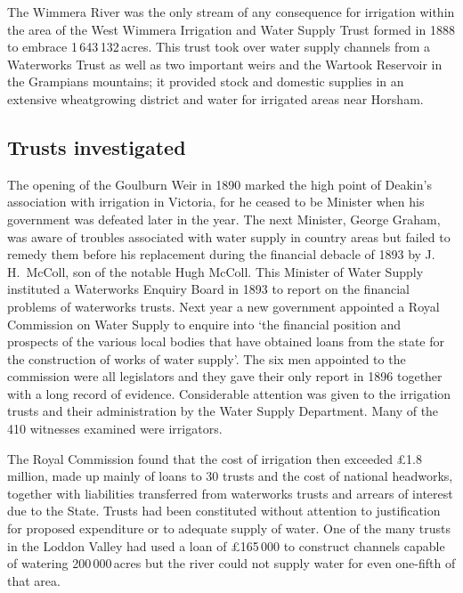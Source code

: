 The Wimmera River  was the only stream of any
consequence for irrigation within the area of the West Wimmera
Irrigation and Water Supply Trust  formed in 1888 to embrace 1\,643\,132\,acres. This trust took
over water supply channels from a Waterworks Trust as well as two
important weirs and the Wartook Reservoir  in
the Grampians mountains; it provided stock and domestic supplies in an
extensive wheatgrowing district and water for irrigated areas near
Horsham. 

\subsection*{Trusts investigated}

The opening of the Goulburn Weir  in 1890 marked
the high point of Deakin's  association with
irrigation in Victoria, for he ceased to be Minister when his
government was defeated later in the year.  The next Minister, George
Graham,  was aware of troubles associated with water
supply in country areas but failed to remedy them before his
replacement during the financial debacle of 1893 by J.\,H.~McColl,
 son
of the notable Hugh McColl.  This Minister of Water Supply instituted
a Waterworks Enquiry Board in 1893 to report on the financial problems
of waterworks trusts.  Next year a new government appointed a Royal
Commission on Water Supply  to enquire into
`the financial position and prospects of the various local bodies that
have obtained loans from the state for the construction of works of
water supply'. The six men appointed to the commission were all
legislators and they gave their only report in 1896 together with a
long record of evidence.  Considerable attention was given to the
irrigation trusts and their administration by the Water Supply
Department.  Many of the 410 witnesses examined were
irrigators.

The Royal Commission found that the cost of irrigation then exceed\-ed
\pounds1.8 million, made up mainly of loans to 30 trusts and the cost of
national headworks, together with liabilities transferred from
waterworks trusts and arrears of interest due to the State.  Trusts
had been constituted without attention to justification for proposed
expenditure or to adequate supply of water.  One of the many trusts in
the Loddon Valley  had used a loan of
\pounds165\,000 to construct channels capable of watering 200\,000\,acres
but the river could not supply water for even one-fifth of that
area.

